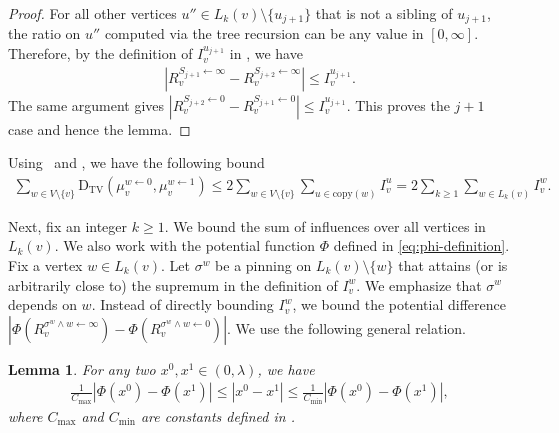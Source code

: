\documentclass[11pt]{amsart}
\def\-#1{\mathrm{#1}}
\newcommand{\abs}[1]{\ensuremath{\left\vert#1\right\vert}}
\newcommand{\DTV}[2]{\-D_{\mathrm{TV}}\left({#1},{#2}\right)}
\newtheorem{lemma}[theorem]{Lemma}
\theoremstyle{definition}
\theoremstyle{remark}
\begin{document}
\begin{proof}
For all other vertices $u'' \in L_k(v) \setminus \{u_{j+1}\}$ that is not a sibling of $u_{j+1}$, the ratio on $u''$ computed via the tree recursion can be any value in $[0,\infty]$.
Therefore, by the definition of $I_v^{u_{j+1}}$ in , we have
\begin{align*}
|R_v^{S_{j+1}\gets \infty} - R_v^{S_{j+2}\gets \infty}|\leq I_v^{u_{j+1}}.
\end{align*}
The same argument gives $|R_v^{S_{j+2}\gets 0} - R_v^{S_{j+1}\gets 0}|\leq I_v^{u_{j+1}}$. This proves the $j+1$ case and hence the lemma.
\end{proof}

Using~ and , we have the following bound 
\begin{align}\label{eq:bound-on-dtv}
    \sum_{w \in V \setminus \{v\}} \DTV{\mu_v^{w \gets 0}}{\mu_v^{w \gets 1}} \leq 2\sum_{w \in V \setminus \{v\}} \sum_{u \in \text{copy}(w)} I_v^u = 2\sum_{k \geq 1} \sum_{w \in L_k(v)} I_v^w.
\end{align}


Next, fix an integer $k \geq 1$. We bound the sum of influences over all vertices in $L_k(v)$. We also work with the potential function $\Phi$ defined in \eqref{eq:phi-definition}. Fix a vertex $w \in L_k(v)$. Let $\sigma^w$ be a pinning on $L_k(v) \setminus \{w\}$ that attains (or is arbitrarily close to) the supremum in the definition of $I_v^w$. We emphasize that $\sigma^w$ depends on $w$. Instead of directly bounding $I_v^w$, we bound the potential difference
$|\Phi(R_v^{\sigma^w \land w \gets \infty}) - \Phi(R_v^{\sigma^w \land w \gets 0})|$.
We use the following general relation.

\begin{lemma}\label{lemma:dtv-bound-potential}
For any two $x^0,x^1 \in (0,\lambda)$, we have
\begin{align*}
   \frac{1}{C_{\max}} \left | \Phi(x^0)-\Phi(x^1) \right | \leq \abs{x^0-x^1} \leq \frac{1}{C_{\min}} \left | \Phi(x^0)-\Phi(x^1) \right |,
\end{align*}
where $C_{\max}$ and $C_{\min}$ are constants defined in .
\end{lemma}
\end{document}
